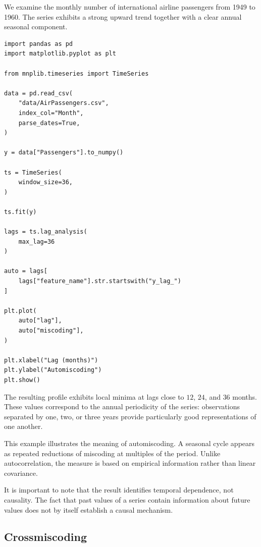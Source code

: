 \begin{example}
\label{ex:airpassengers_automiscoding}

We examine the monthly number of international airline passengers from 1949 to
1960. The series exhibits a strong upward trend together with a clear annual
seasonal component.

\begin{sourcecode}
{\scriptsize
\begin{verbatim}
import pandas as pd
import matplotlib.pyplot as plt

from mnplib.timeseries import TimeSeries

data = pd.read_csv(
    "data/AirPassengers.csv",
    index_col="Month",
    parse_dates=True,
)

y = data["Passengers"].to_numpy()

ts = TimeSeries(
    window_size=36,
)

ts.fit(y)

lags = ts.lag_analysis(
    max_lag=36
)

auto = lags[
    lags["feature_name"].str.startswith("y_lag_")
]

plt.plot(
    auto["lag"],
    auto["miscoding"],
)

plt.xlabel("Lag (months)")
plt.ylabel("Automiscoding")
plt.show()
\end{verbatim}}
\end{sourcecode}

The resulting profile exhibits local minima at lags close to \(12\), \(24\),
and \(36\) months. These values correspond to the annual periodicity of the
series: observations separated by one, two, or three years provide particularly
good representations of one another.

This example illustrates the meaning of automiscoding. A seasonal cycle appears
as repeated reductions of miscoding at multiples of the period. Unlike
autocorrelation, the measure is based on empirical information rather than
linear covariance.

It is important to note that the result identifies temporal dependence, not
causality. The fact that past values of a series contain information about future
values does not by itself establish a causal mechanism.
\end{example}

\subsection*{Crossmiscoding}

